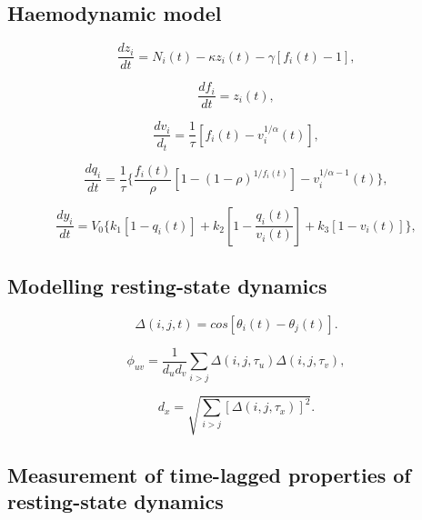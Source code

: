 \documentclass[sn-mathphys-num]{sn-jnl}%
\theoremstyle{thmstyleone}%
\theoremstyle{thmstyletwo}%
\theoremstyle{thmstylethree}%
\begin{document}
\subsection{Haemodynamic model} \label{sec:haemodynamic_model}


\begin{equation}\label{eq:vasodilatory_signal}
	\frac{dz_i}{dt} = N_i (t) - 
	\kappa z_i(t) - 
	\gamma [f_i(t) - 1], 
\end{equation}


\begin{equation}\label{eq:blood_inflow}
	\frac{df_i}{dt} = z_i(t),
\end{equation}


\begin{equation}\label{eq:blood_volume}
	\frac{dv_i}{d_t} = \frac{1}{\tau} [f_i(t) - v_i^{1/\alpha} (t)],
\end{equation}


\begin{equation}\label{eq:deoxyhaemoglobin}
	\frac{dq_i}{dt} = \frac{1}{\tau}
	\{
	\frac{f_i(t)}{\rho}
	[1 - (1-\rho)^{1/f_i(t)}]
	- v_i^{1/\alpha - 1} (t)
	\},
\end{equation}


\begin{equation}\label{eq:BOLD_signal}
	\frac{dy_i}{dt} = V_0
	\{
	k_1 [1 - q_i(t)] +
	k_2 [1 - \frac{q_i(t)}{v_i(t)}] + 
	k_3 [1 - v_i(t)]
	\},
\end{equation}


\subsection{Modelling resting-state dynamics} \label{sec:modelling_resting}


\begin{equation}\label{eq:synchrony}
	\Delta(i,j,t) = cos [\theta_i (t) - \theta_j (t)].
\end{equation}


\begin{equation}\label{eq:synchrony_similarity}
	\phi_{uv} = \frac{1}{d_u d_v} 
	\sum_{i>j} \Delta(i,j,\tau_u) \Delta(i,j,\tau_v),
\end{equation}

\begin{equation}\label{key}
	d_x = \sqrt{\sum_{i>j}
		[
		\Delta(i,j,\tau_x)
		]^2
	}.
\end{equation}


\subsection{Measurement of time-lagged properties of resting-state dynamics} \label{sec:dynamics_measurement}
\end{document}

